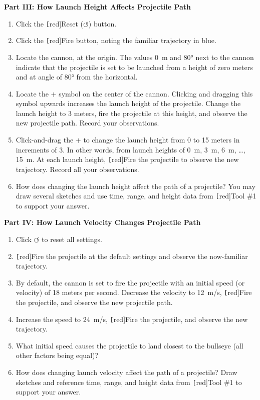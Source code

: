 \documentclass[main-physics.tex]{subfiles}
\begin{document}
\textbf{Part III: How Launch Height Affects Projectile Path}
\begin{enumerate}
    \item Click the \texttt[red]{Reset} ($\boldsymbol{\circlearrowleft}$) button.
    \item Click the \texttt[red]{Fire} button, noting the familiar trajectory in blue.
    \item Locate the cannon, at the origin. The values \SI{0}{m} and \ang{80} next to the cannon indicate that the projectile is set to be launched from a height of zero meters and at angle of \ang{80} from the horizontal.
    \item Locate the $\boldsymbol{+}$ symbol on the center of the cannon. Clicking and dragging this symbol upwards increases the launch height of the projectile. Change the launch height to 3 meters, fire the projectile at this height, and observe the new projectile path. Record your observations.
    \item Click-and-drag the $\boldsymbol{+}$ to change the launch height from 0 to 15 meters in increments of 3. In other words, from launch heights of \SI{0}{m}, \SI{3}{m}, \SI{6}{m}, \ldots, \SI{15}{m}. At each launch height, \texttt[red]{Fire} the projectile to observe the new trajectory. Record all your observations. 
    \item How does changing the launch height affect the path of a projectile? You may draw several sketches and use time, range, and height data from \texttt[red]{Tool \#1} to support your answer.
\end{enumerate}

\vspace{1em}

\textbf{Part IV: How Launch Velocity Changes Projectile Path}

\begin{enumerate}
    \item Click $\boldsymbol{\circlearrowleft}$ to reset all settings.
    \item \texttt[red]{Fire} the projectile at the default settings and observe the now-familiar trajectory. 
    \item By default, the cannon is set to fire the projectile with an initial speed (or velocity) of 18 meters per second. Decrease the velocity to \SI{12}{m/s}, \texttt[red]{Fire} the projectile, and observe the new projectile path.
    \item Increase the speed to \SI{24}{m/s}, \texttt[red]{Fire} the projectile, and observe the new trajectory.
    \item What initial speed causes the projectile to land closest to the bullseye (all other factors being equal)?
    \item How does changing launch velocity affect the path of a projectile? Draw sketches and reference time, range, and height data from \texttt[red]{Tool \#1} to support your answer.
\end{enumerate}
\end{document}
